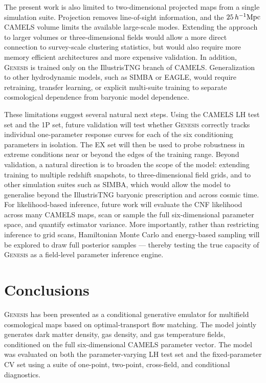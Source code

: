 \documentclass[usenatbib]{mnras}
\begin{document}
The present work is also limited to two-dimensional projected maps
from a single simulation suite. Projection removes line-of-sight
information, and the $25\,h^{-1}{\rm Mpc}$ CAMELS volume limits the
available large-scale modes. Extending the approach to larger volumes
or three-dimensional fields would allow a more direct connection to
survey-scale clustering statistics, but would also require more memory
efficient architectures and more expensive validation. In addition,
\textsc{Genesis} is trained only on the IllustrisTNG branch of CAMELS.
Generalization to other hydrodynamic models, such as SIMBA or EAGLE,
would require retraining, transfer learning, or explicit multi-suite
training to separate cosmological dependence from baryonic model
dependence.

These limitations suggest several natural next steps. Using the CAMELS
LH test set and the 1P set, future validation will test whether
\textsc{Genesis} correctly tracks individual one-parameter response
curves for each of the six conditioning parameters in isolation. The EX set will then be
used to probe robustness in extreme conditions near or beyond the
edges of the training range. Beyond validation, a natural direction is
to broaden the scope of the model: extending training to multiple
redshift snapshots, to three-dimensional field grids, and to other
simulation suites such as SIMBA, which would allow the model to
generalise beyond the IllustrisTNG baryonic prescription and across
cosmic time. For likelihood-based inference, future work will evaluate
the CNF likelihood across many CAMELS maps, scan or sample the full
six-dimensional parameter space, and quantify estimator variance.
More importantly, rather than restricting inference to grid scans,
Hamiltonian Monte Carlo and energy-based sampling will be explored
to draw full posterior samples --- thereby testing the true capacity
of \textsc{Genesis} as a field-level parameter inference engine.

\section{Conclusions}
\label{sec:conclusions}

\textsc{Genesis} has been presented as a conditional generative emulator
for multifield cosmological maps based on optimal-transport flow
matching. The model jointly generates dark matter density,
gas density, and gas temperature fields, conditioned on the full
six-dimensional CAMELS parameter vector. The model was evaluated on
both the parameter-varying LH test set and the fixed-parameter CV set
using a suite of one-point, two-point, cross-field, and conditional
diagnostics.
\end{document}
